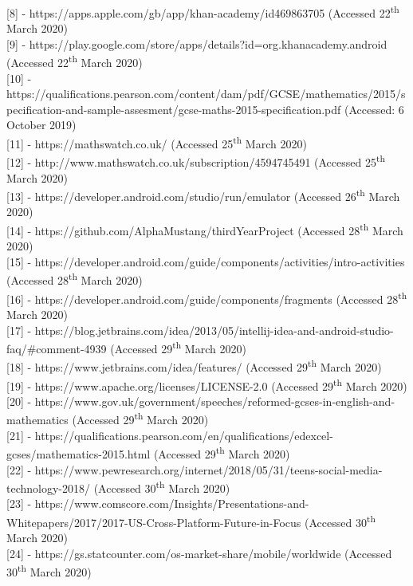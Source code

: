 \documentclass{article}
\begin{document}
[8] - https://apps.apple.com/gb/app/khan-academy/id469863705 (Accessed 22\textsuperscript{th} March 2020) \\ 

[9] - https://play.google.com/store/apps/details?id=org.khanacademy.android (Accessed 22\textsuperscript{th} March 2020) \\

[10] - https://qualifications.pearson.com/content/dam/pdf/GCSE/mathematics/2015/specification-and-sample-assesment/gcse-maths-2015-specification.pdf (Accessed: 6 October 2019) \\

[11] - https://mathswatch.co.uk/ (Accessed 25\textsuperscript{th} March 2020) \\

[12] - http://www.mathswatch.co.uk/subscription/4594745491 (Accessed 25\textsuperscript{th} March 2020) \\

[13] - https://developer.android.com/studio/run/emulator (Accessed 26\textsuperscript{th} March 2020) \\

[14] - https://github.com/AlphaMustang/thirdYearProject (Accessed 28\textsuperscript{th} March 2020) \\

[15] - https://developer.android.com/guide/components/activities/intro-activities (Accessed 28\textsuperscript{th} March 2020) \\

[16] - https://developer.android.com/guide/components/fragments (Accessed 28\textsuperscript{th} March 2020) \\

[17] - https://blog.jetbrains.com/idea/2013/05/intellij-idea-and-android-studio-faq/\#comment-4939 (Accessed 29\textsuperscript{th} March 2020) \\

[18] - https://www.jetbrains.com/idea/features/ (Accessed 29\textsuperscript{th} March 2020) \\ 

[19] - https://www.apache.org/licenses/LICENSE-2.0 (Accessed 29\textsuperscript{th} March 2020) \\

[20] - https://www.gov.uk/government/speeches/reformed-gcses-in-english-and-mathematics (Accessed 29\textsuperscript{th} March 2020) \\

[21] - https://qualifications.pearson.com/en/qualifications/edexcel-gcses/mathematics-2015.html (Accessed 29\textsuperscript{th} March 2020) \\

[22] - https://www.pewresearch.org/internet/2018/05/31/teens-social-media-technology-2018/ (Accessed 30\textsuperscript{th} March 2020) \\

[23] - https://www.comscore.com/Insights/Presentations-and-Whitepapers/2017/2017-US-Cross-Platform-Future-in-Focus (Accessed 30\textsuperscript{th} March 2020) \\

[24] - https://gs.statcounter.com/os-market-share/mobile/worldwide (Accessed 30\textsuperscript{th} March 2020)
\end{document}
